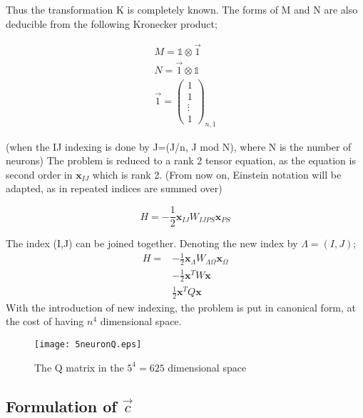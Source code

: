 \documentclass[%
 reprint,
 amsmath,amssymb,
 aps,
]{revtex4-1}
\begin{document}
Thus the transformation K is completely known. The forms of M and N are also deducible from the following Kronecker product;

\begin{equation}
	\begin{gathered}
		M = \mathbb{1} \otimes \vec{1} \\
		N = \vec{1} \otimes \mathbb{1} \\
		\vec{1} = 
			\begin{pmatrix}
				1 \\ 1 \\ \vdots \\ 1
			\end{pmatrix}_{n,1}
	\end{gathered}
\end{equation}

(when the IJ indexing is done by J=(J/n, J mod N), where N is the number of neurons) The problem is reduced to a rank 2 tensor equation, as the equation is second order in $\mathbf{x}_{IJ}$ which is rank 2. (From now on, Einstein notation will be adapted, as in repeated indices are summed over)

\begin{equation}
	H = -\frac{1}{2} \mathbf{x}_{IJ} W_{IJPS} \mathbf{x}_{PS}
\end{equation}

The index (I,J) can be joined together. Denoting the new index by $\Lambda = (I,J)$;
\begin{equation}
	\begin{split}
		H = & -\frac{1}{2} \mathbf{x}_{\Lambda} W_{\Lambda\Omega} \mathbf{x}_{\Omega} \\
			& -\frac{1}{2} \mathbf{x}^T W \mathbf{x} \\
			& \frac{1}{2} \mathbf{x}^T Q \mathbf{x}
	\end{split}
\end{equation}
With the introduction of new indexing, the problem is put in canonical form, at the cost of having $n^4$ dimensional space.

\begin{figure}[!ht]
	\centering
	\texttt{[image: 5neuronQ.eps]}
	\caption{The Q matrix in the $5^4=625$ dimensional space}
\end{figure}

\subsection{\label{sec2:c}Formulation of $\vec{c}$}
\end{document}
